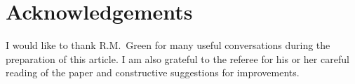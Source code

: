 \documentclass[12pt]{amsart}
\renewcommand{\(}{\left(}
\renewcommand{\)}{\right)}
\begin{document}

\section*{Acknowledgements}

I would like to thank R.M.~Green for many useful conversations during the preparation of this article.  I am also grateful to the referee for his or her careful reading of the paper and constructive suggestions for improvements.





\end{document}
